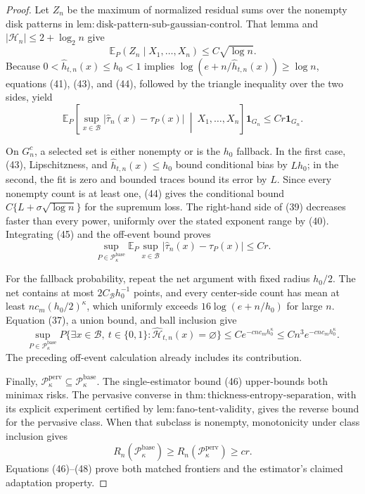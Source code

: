 \documentclass{article}
\begin{document}
\begin{proof}
Let \(Z_n\) be the maximum of normalized residual sums over the nonempty
disk patterns in
\(\mathrm{lem:disk\text{-}pattern\text{-}sub\text{-}gaussian\text{-}control}\).
That lemma and \(|\mathcal H_n|\le2+\log_2n\) give
\[
 \mathbb E_P(Z_n\mid X_1,\ldots,X_n)\le C\sqrt{\log n}.
 \tag{44}
\]
Because \(0<\widehat h_{t,n}(x)\le h_0<1\) implies
\(\log(e+n/\widehat h_{t,n}(x))\ge\log n\), equations (41), (43), and
(44), followed by the triangle inequality over the two sides, yield
\[
 \mathbb E_P\!\left[
 \sup_{x\in\mathcal B}|\widehat\tau_n(x)-\tau_P(x)|
 \ \middle|\ X_1,\ldots,X_n\right]\mathbf1_{G_n}
 \le Cr\mathbf1_{G_n}.
 \tag{45}
\]

On \(G_n^c\), a selected set is either nonempty or is the \(h_0\)
fallback.  In the first case, (43), Lipschitzness, and
\(\widehat h_{t,n}(x)\le h_0\) bound conditional bias by \(Lh_0\); in
the second, the fit is zero and bounded traces bound its error by \(L\).
Since every nonempty count is at least one, (44) gives the conditional
bound \(C\{L+\sigma\sqrt{\log n}\}\) for the supremum loss.  The
right-hand side of (39) decreases faster than every power, uniformly over
the stated exponent range by (40).  Integrating (45) and the off-event
bound proves
\[
 \sup_{P\in\mathcal P_{\kappa}^{\mathrm{base}}}
 \mathbb E_P\sup_{x\in\mathcal B}|\widehat\tau_n(x)-\tau_P(x)|
 \le Cr.
 \tag{46}
\]

For the fallback probability, repeat the net argument with fixed radius
\(h_0/2\).  The net contains at most
\(2C_{\mathcal B}h_0^{-1}\) points, and every center-side count has mean
at least \(nc_m(h_0/2)^\kappa\), which uniformly exceeds
\(16\log(e+n/h_0)\) for large \(n\).  Equation (37), a union bound, and
ball inclusion give
\[
 \sup_{P\in\mathcal P_{\kappa}^{\mathrm{base}}}
 P\{\exists x\in\mathcal B,\ t\in\{0,1\}:
 \widehat{\mathcal H}_{t,n}(x)=\varnothing\}
 \le C e^{-c n c_mh_0^\kappa}
 \le Cn^3e^{-c n c_mh_0^\kappa}.
 \tag{47}
\]
The preceding off-event calculation already includes its contribution.

Finally,
\(\mathcal P_{\kappa}^{\mathrm{perv}}\subseteq
\mathcal P_{\kappa}^{\mathrm{base}}\).  The single-estimator bound (46)
upper-bounds both minimax risks.  The pervasive converse in
\(\mathrm{thm:thickness\text{-}entropy\text{-}separation}\), with its
explicit experiment certified by
\(\mathrm{lem:fano\text{-}tent\text{-}validity}\), gives the reverse
bound for the pervasive class.  When that subclass is nonempty,
monotonicity under class inclusion gives
\[
 R_n(\mathcal P_{\kappa}^{\mathrm{base}})
 \ge R_n(\mathcal P_{\kappa}^{\mathrm{perv}})
 \ge cr.
 \tag{48}
\]
Equations (46)--(48) prove both matched frontiers and the estimator's
claimed adaptation property.
\end{proof}
\end{document}
